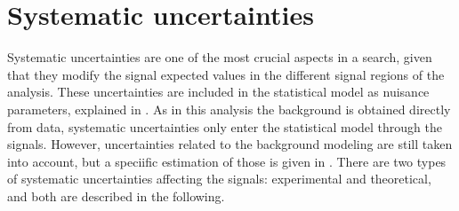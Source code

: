 








\section{Systematic uncertainties}
\label{sec:signals:systs}

Systematic uncertainties are one of the most crucial aspects in a search, given that they modify the signal expected values in the different signal regions of the analysis. These uncertainties are included in the statistical model as nuisance parameters, explained in \Sect{\ref{subsec:strategy:stat_treatment:systs}}.
As in this analysis the background is obtained directly from data, systematic uncertainties only enter the statistical model through the signals. However, uncertainties related to the background modeling are still taken into account, but a speciific estimation of those is given in \Ch{\ref{ch:bkg}}. 
There are two types of systematic uncertainties affecting the signals: experimental and theoretical, and both are described in the following.


